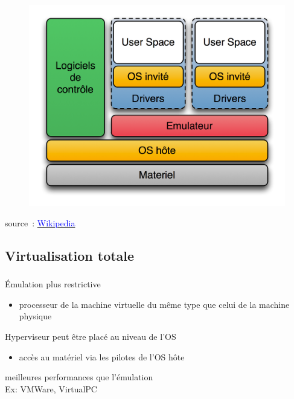 \begin{frame}
\frametitle{\insertsubsection}
\vspace{-0.5cm}
\begin{figure}
  \includegraphics[width=0.8\linewidth]{fig4/Diagramme_ArchiEmulateur.png}
\end{figure}
\vspace{-0.5cm}
\small{source~: \href{http://fr.wikipedia.org/wiki/Fichier:Diagramme_ArchiEmulateur.png}{\textcolor{blue}{Wikipedia}}}
\end{frame}


\subsection{Virtualisation totale}
\begin{frame}
\frametitle{\insertsubsection}
Émulation plus restrictive 
\begin{itemize}
\item processeur de la machine virtuelle du même type que celui de la
  machine physique
\end{itemize}
\vspace{0.5cm}
Hyperviseur peut être placé au niveau de l'OS
\begin{itemize}
\item accès au matériel via les pilotes de l'OS hôte
\end{itemize}
\vspace{0.5cm}
 meilleures performances que l'émulation\\
\vspace{0.2cm}
Ex: VMWare, VirtualPC
\end{frame}


